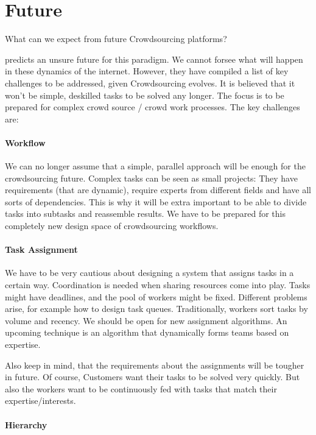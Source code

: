 \documentclass{sig-alternate}
\begin{document}
\section{Future}

What can we expect from future Crowdsourcing platforms?

\cite{future} predicts an unsure future for this paradigm. We cannot forsee what will happen in these dynamics of the internet. However, they have compiled
a list of key challenges to be addressed, given Crowdsourcing evolves. It is believed that it won't be simple, deskilled tasks to be solved any longer. The focus is to be prepared for complex crowd source / crowd work processes. The key challenges are:  

\paragraph{Workflow}
We can no longer assume that a simple, parallel approach will be enough for the crowdsourcing future. Complex tasks can be seen as small projects:
They have requirements (that are dynamic), require experts from different fields and have all sorts of dependencies.
This is why it will be extra important to be able to divide tasks into subtasks and reassemble results. We have to be prepared for this completely new design 
space of crowdsourcing workflows.

\paragraph{Task Assignment}

We have to be very cautious about designing a system that assigns tasks in a certain way. Coordination is needed when sharing resources come into play.
Tasks might have deadlines, and the pool of workers might be fixed. Different problems arise, for example how to design task queues. 
Traditionally, workers sort tasks by volume and recency. We should be open for new assignment algorithms. An upcoming technique is 
an algorithm that dynamically forms teams based on expertise. 

Also keep in mind, that the requirements about the assignments will be tougher in future. Of course, Customers want their tasks to be solved very quickly.
But also the workers want to be continuously fed with tasks that match their expertise/interests.

\paragraph{Hierarchy}
\end{document}
